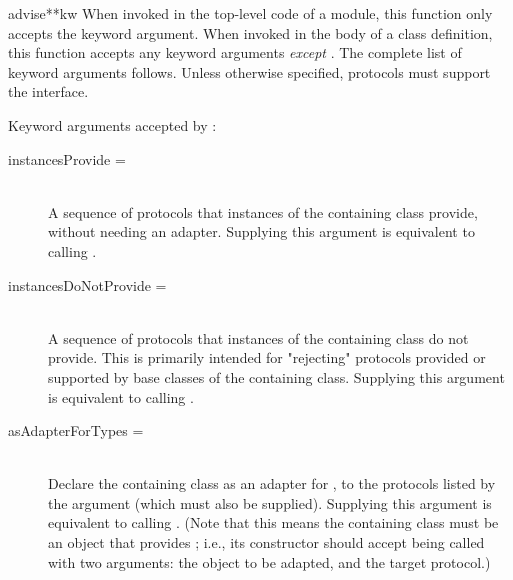 \begin{verbatim%
}
\begin{verbatim%
}
\begin{verbatim%
}
\begin{verbatim%
}
\begin{funcdesc}{advise}{**kw}
When invoked in the top-level code of a module, this function only accepts
the  keyword argument.  When invoked in the body of a
class definition, this function accepts any keyword arguments \emph{except}
.  The complete list of keyword arguments follows.
Unless otherwise specified, protocols must support the 
interface.

\end{funcdesc}













Keyword arguments accepted by :

\begin{description}

\item[instancesProvide = ] \hfill \\
A sequence of protocols that instances of the containing class provide, without
needing an adapter.  Supplying this argument is equivalent to calling
.

\item[instancesDoNotProvide = ] \hfill \\
A sequence of protocols that instances of the containing class do not provide.
This is primarily intended for "rejecting" protocols provided or supported
by base classes of the containing class.  Supplying this argument is equivalent
to calling .

\item[asAdapterForTypes = ] \hfill \\
Declare the containing class as an adapter for , to the protocols
listed by the  argument (which must also be supplied).
Supplying this argument is equivalent to calling
.  (Note that this means the containing class must be an
object that provides ; i.e., its constructor should
accept being called with two arguments: the object to be adapted, and the
target protocol.)


\end{description}
\end{verbatim%
}
\end{verbatim%
}
\end{verbatim%
}
\end{verbatim%
}
